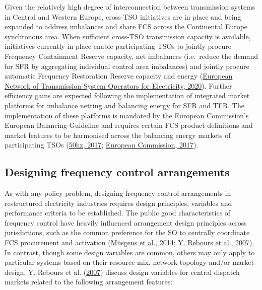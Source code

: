 \documentclass[12pt,a4paper,]{report}
\begin{document}
Given the relatively high degree of interconnection between transmission
systems in Central and Western Europe, cross-TSO initiatives are in
place and being expanded to address imbalances and share FCS across the
Continental Europe synchronous area. When sufficient cross-TSO
transmission capacity is available, initiatives currently in place
enable participating TSOs to jointly procure Frequency Containment
Reserve capacity, net imbalances (i.e.~reduce the demand for SFR by
aggregating individual control area imbalances) and jointly procure
automatic Frequency Restoration Reserve capacity and energy
(\protect\hyperlink{ref-europeannetworkoftransmissionsystemoperatorsforelectricityentso-eENTSOEBalancingReport2020}{European
Network of Transmission System Operators for Electricity, 2020}).
Further efficiency gains are expected following the implementation of
integrated market platforms for imbalance netting and balancing energy
for SFR and TFR. The implementation of these platforms is mandated by
the European Commission's European Balancing Guideline and requires
certain FCS product definitions and market features to be harmonised
across the balancing energy markets of participating TSOs
(\protect\hyperlink{ref-50hzamprionapgeliartetennetConsultationDesignPlatform2017}{50hz,
2017};
\protect\hyperlink{ref-europeancommissionCommissionRegulationEU2017}{European
Commission, 2017}).

\hypertarget{sec:fcs-design}{%
\subsection{Designing frequency control
arrangements}\label{sec:fcs-design}}

As with any policy problem, designing frequency control arrangements in
restructured electricity industries requires design principles,
variables and performance criteria to be established. The public good
characteristics of frequency control have heavily influenced arrangement
design principles across jurisdictions, such as the common preference
for the SO to centrally coordinate FCS procurement and activation
(\protect\hyperlink{ref-musgensEconomicsDesignBalancing2014}{Müsgens et
al., 2014};
\protect\hyperlink{ref-reboursFundamentalDesignIssues2007}{Y. Rebours et
al., 2007}). In contrast, though some design variables are common,
others may only apply to particular systems based on their resource mix,
network topology and/or market design. Y. Rebours et al.
(\protect\hyperlink{ref-reboursFundamentalDesignIssues2007}{2007})
discuss design variables for central dispatch markets related to the
following arrangement features:
\end{document}
